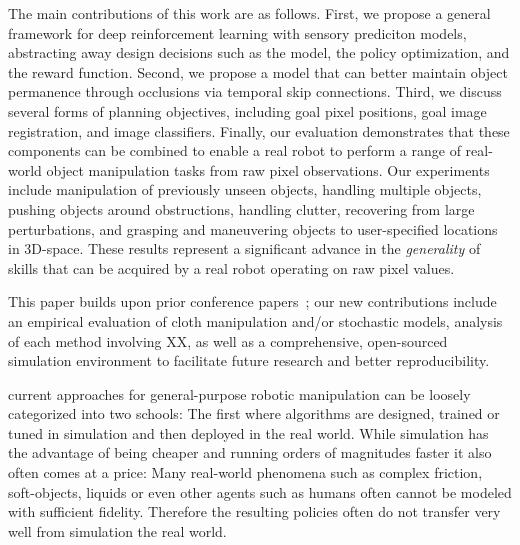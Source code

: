 The main contributions of this work are as follows. First, we propose a general framework for deep reinforcement learning with sensory prediciton models, abstracting away design decisions such as the model, the policy optimization, and the reward function.
Second, we propose a model that can better maintain object permanence through occlusions via temporal skip connections.
Third, we discuss several forms of planning objectives, including goal pixel positions, goal image registration, and image classifiers.
Finally, our evaluation demonstrates that these components can be combined to enable a real robot to perform a range of real-world object manipulation tasks from raw pixel observations. Our experiments include manipulation of previously unseen objects, handling multiple objects, pushing objects around obstructions, handling clutter, recovering from large perturbations, and grasping and maneuvering objects to user-specified locations in 3D-space. These results represent a significant advance in the \emph{generality} of skills that can be acquired by a real robot operating on raw pixel values.

This paper builds upon prior conference papers~\cite{todo}; our new contributions include an empirical evaluation of cloth manipulation and/or stochastic models, analysis of each method involving XX, as well as a comprehensive, open-sourced simulation environment to facilitate future research and better reproducibility.






\iffalse

current approaches for general-purpose robotic manipulation can be loosely categorized into two schools: The first where algorithms are designed, trained or tuned in simulation and then deployed in the real world. While simulation has the advantage of being cheaper and running orders of magnitudes faster it also often comes at a price: Many real-world phenomena such as complex friction, soft-objects, liquids or even other agents such as humans often cannot be modeled with sufficient fidelity. Therefore the resulting policies often do not transfer very well from simulation the real world.

